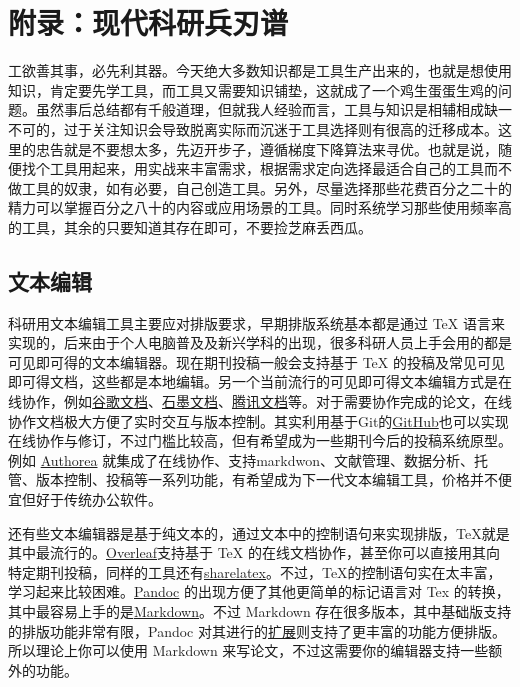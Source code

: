 \documentclass[]{tufte-book}
\begin{document}
\hypertarget{tool}{%
\chapter*{附录：现代科研兵刃谱}\label{tool}}

工欲善其事，必先利其器。今天绝大多数知识都是工具生产出来的，也就是想使用知识，肯定要先学工具，而工具又需要知识铺垫，这就成了一个鸡生蛋蛋生鸡的问题。虽然事后总结都有千般道理，但就我人经验而言，工具与知识是相辅相成缺一不可的，过于关注知识会导致脱离实际而沉迷于工具选择则有很高的迁移成本。这里的忠告就是不要想太多，先迈开步子，遵循梯度下降算法来寻优。也就是说，随便找个工具用起来，用实战来丰富需求，根据需求定向选择最适合自己的工具而不做工具的奴隶，如有必要，自己创造工具。另外，尽量选择那些花费百分之二十的精力可以掌握百分之八十的内容或应用场景的工具。同时系统学习那些使用频率高的工具，其余的只要知道其存在即可，不要捡芝麻丢西瓜。

\hypertarget{ux6587ux672cux7f16ux8f91}{%
\section*{文本编辑}\label{ux6587ux672cux7f16ux8f91}}

科研用文本编辑工具主要应对排版要求，早期排版系统基本都是通过 TeX 语言来实现的，后来由于个人电脑普及及新兴学科的出现，很多科研人员上手会用的都是可见即可得的文本编辑器。现在期刊投稿一般会支持基于 TeX 的投稿及常见可见即可得文档，这些都是本地编辑。另一个当前流行的可见即可得文本编辑方式是在线协作，例如\href{https://docs.google.com/}{谷歌文档}、\href{https://shimo.im/}{石墨文档}、\href{https://docs.qq.com/}{腾讯文档}等。对于需要协作完成的论文，在线协作文档极大方便了实时交互与版本控制。其实利用基于Git的\href{https://github.com/}{GitHub}也可以实现在线协作与修订，不过门槛比较高，但有希望成为一些期刊今后的投稿系统原型。例如 \href{https://www.authorea.com}{Authorea} 就集成了在线协作、支持markdwon、文献管理、数据分析、托管、版本控制、投稿等一系列功能，有希望成为下一代文本编辑工具，价格并不便宜但好于传统办公软件。

还有些文本编辑器是基于纯文本的，通过文本中的控制语句来实现排版，TeX就是其中最流行的。\href{https://www.overleaf.com/}{Overleaf}支持基于 TeX 的在线文档协作，甚至你可以直接用其向特定期刊投稿，同样的工具还有\href{https://www.sharelatex.com/}{sharelatex}。不过，TeX的控制语句实在太丰富，学习起来比较困难。\href{https://pandoc.org/}{Pandoc} 的出现方便了其他更简单的标记语言对 Tex 的转换，其中最容易上手的是\href{https://daringfireball.net/projects/markdown/}{Markdown}。不过 Markdown 存在很多版本，其中基础版支持的排版功能非常有限，Pandoc 对其进行的\href{https://pandoc.org/MANUAL.html\#pandocs-markdown}{扩展}则支持了更丰富的功能方便排版。所以理论上你可以使用 Markdown 来写论文，不过这需要你的编辑器支持一些额外的功能。
\end{document}
